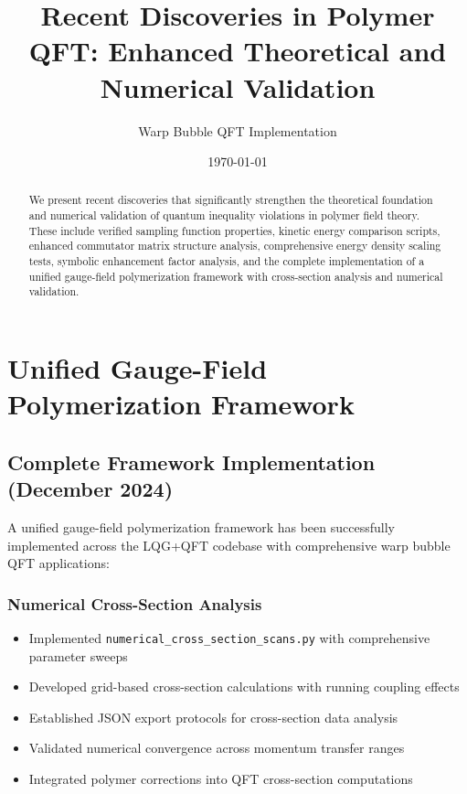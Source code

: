 \documentclass[11pt]{article}
\title{Recent Discoveries in Polymer QFT: Enhanced Theoretical and Numerical Validation}
\author{Warp Bubble QFT Implementation}
\date{\today}
\begin{document}
\maketitle

\begin{abstract}
We present recent discoveries that significantly strengthen the theoretical foundation and numerical validation of quantum inequality violations in polymer field theory. These include verified sampling function properties, kinetic energy comparison scripts, enhanced commutator matrix structure analysis, comprehensive energy density scaling tests, symbolic enhancement factor analysis, and the complete implementation of a unified gauge-field polymerization framework with cross-section analysis and numerical validation.
\end{abstract}

\section{Unified Gauge-Field Polymerization Framework}

\subsection{Complete Framework Implementation (December 2024)}

A unified gauge-field polymerization framework has been successfully implemented across the LQG+QFT codebase with comprehensive warp bubble QFT applications:

\subsubsection{Numerical Cross-Section Analysis}
\begin{itemize}
    \item Implemented \texttt{numerical\_cross\_section\_scans.py} with comprehensive parameter sweeps
    \item Developed grid-based cross-section calculations with running coupling effects
    \item Established JSON export protocols for cross-section data analysis
    \item Validated numerical convergence across momentum transfer ranges
    \item Integrated polymer corrections into QFT cross-section computations
\end{itemize}
\end{document}
